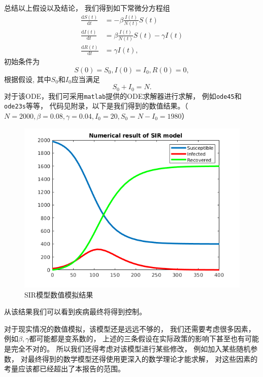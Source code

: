 \documentclass[a4paper]{article}
\newcommand{\dif}{\mathrm{d}}
\begin{document}
\begin{CJK*}{UTF8}{gkai}
  总结以上假设以及结论，
  我们得到如下常微分方程组
  \begin{align*}
    \frac{\dif S(t)}{\dif t} &= -\beta \frac{I(t)}{N(t)}S(t) \\
    \frac{\dif I(t)}{\dif t} &= \beta \frac{I(t)}{N(t)}S(t)-\gamma I(t) \\
    \frac{\dif R(t)}{\dif t} &= \gamma I(t),
  \end{align*}
  初始条件为
  \begin{displaymath}
    S(0) = S_0, I(0) = I_0, R(0) = 0,
  \end{displaymath}
  根据假设, 其中$S_0$和$I_0$应当满足
  \begin{displaymath}
    S_0 + I_0 = N.
  \end{displaymath}
  对于该ODE，我们可采用\verb|matlab|提供的ODE求解器进行求解，
  例如\verb|ode45|和\verb|ode23s|等等，
  代码见附录，以下是我们得到的数值结果。（$N=2000, \beta=0.08, \gamma=0.04,
  I_0=20, S_0=N-I_0=1980$）
  \begin{figure}[H]
    \centering
    \includegraphics[scale=0.60]{png/SIR.png}
    \caption{SIR模型数值模拟结果}
  \end{figure}
  从该结果我们可以看到疾病最终将得到控制。

  对于现实情况的数值模拟，该模型还是远远不够的，
  我们还需要考虑很多因素，
  例如$\beta, \gamma$都可能都是变系数的，
  上述的三条假设在实际政策的影响下甚至也有可能是完全不对的。
  所以我们还得考虑对该模型进行某些修改，
  例如加入某些随机参数，
  对最终得到的数学模型还得使用更深入的数学理论才能求解，
  对这些因素的考量应该都已经超出了本报告的范围。


\end{CJK*}
\end{document}

